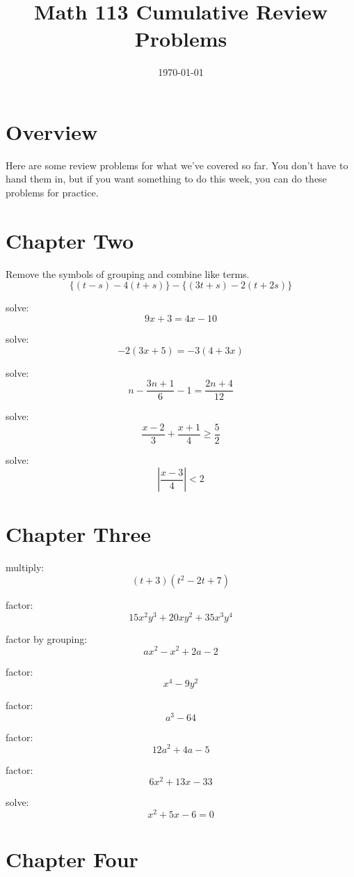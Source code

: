 \documentclass[fleqn,addpoints]{exam}
\title{Math 113 Cumulative Review Problems}
\author{}
\date{\today}
\begin{document}
\maketitle

\section{Overview}

Here are some review problems for what we've covered so far.  You don't have to hand them in, but if you want something
to do this week, you can do these problems for practice.


\begin{questions}

\section{Chapter Two}

\question
Remove the symbols of grouping and combine like terms.
\[
  \{(t-s) - 4(t + s)\} - \{(3t+s) - 2(t+2s)\}
\]

\question solve: \[ 9x + 3 = 4x - 10 \]

\question solve: \[ -2(3x+5) = -3(4+3x) \]

\question solve: \[ n - \frac{3n+1}{6} - 1 = \frac{2n+4}{12} \]


\question solve: \[ \displaystyle \frac{x-2}{3} + \frac{x+1}{4} \geq \frac{5}{2} \]

\question solve: \[ \displaystyle | \frac{x-3}{4} | < 2 \]

\section{Chapter Three}

\question multiply: \[ (t+3)(t^2-2t+7) \]

\question factor: \[ 15x^2y^3 + 20xy^2 + 35x^3y^4 \]

\question factor by grouping: \[ ax^2 - x^2 + 2a - 2 \]

\question factor: \[ x^4 - 9y^2 \]

\question factor: \[ a^3 - 64 \]

\question factor: \[ 12a^2 + 4a - 5 \]

\question factor: \[ 6x^2 + 13x - 33 \]

\question solve: \[ x^2 + 5x - 6 = 0 \]

\section{Chapter Four}


\end{questions}
\end{document}
